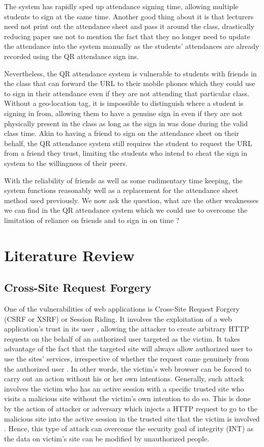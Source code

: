\documentclass[runningheads]{llncs}
\begin{document}
The system has rapidly sped up attendance signing time, allowing multiple students to sign at the same time. Another good thing about it is that lecturers need not print out the attendance sheet and pass it around the class, drastically reducing paper use not to mention the fact that they no longer need to update the attendance into the system manually as the students' attendances are already recorded using the QR attendance sign ins. 

Nevertheless, the QR attendance system is vulnerable to students with friends in the class that can forward the URL to their mobile phones which they could use to sign in their attendance even if they are not attending that particular class. Without a geo-location tag, it is impossible to distinguish where a student is signing in from, allowing them to have a genuine sign in even if they are not physically present in the class as long as the sign in was done during the valid class time. Akin to having a friend to sign on the attendance sheet on their behalf, the QR attendance system still requires the student to request the URL from a friend they trust, limiting the students who intend to cheat the sign in system to the willingness of their peers. 

With the reliability of friends as well as some rudimentary time keeping, the system functions reasonably well as a replacement for the attendance sheet method used previously. We now ask the question, what are the other weaknesses we can find in the QR attendance system which we could use to overcome the limitation of reliance on friends and to sign in on time ?
%
%
\section{Literature Review}
\subsection{Cross-Site Request Forgery} 
One of the vulnerabilities of web applications is Cross-Site Request Forgery (CSRF or XSRF) or Session Riding. It involves the exploitation of a web application’s trust in its user
\cite{siddiqui_verma_2011}, allowing the attacker to create arbitrary HTTP requests on the behalf of an authorized user targeted as the victim. It takes advantage of the fact that the targeted site will always allow authorized user to use the sites’ services, irrespective of whether the request came genuinely from the authorized user
\cite{jovanoic_kirda_kruegel_2006}. In other words, the victim’s web browser can be forced to carry out an action without his or her own intentions. Generally, such attack involves the victim who has an active session with a specific trusted site who visits a malicious site without the victim’s own intention to do so. This is done by the action of attacker or adversary which injects a HTTP request to go to the malicious site into the active session in the trusted site that the victim is involved
\cite{csrf_1} \cite{csrf_2}. Hence, this type of attack can overcome the security goal of integrity (INT) as the data on victim’s site can be modified by unauthorized people.
\end{document}

